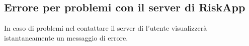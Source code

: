 \subsection{Errore per problemi con il server di RiskApp}
	In caso di problemi nel contattare il server di \riskapp{} l'utente visualizzerà istantaneamente un messaggio di errore.
